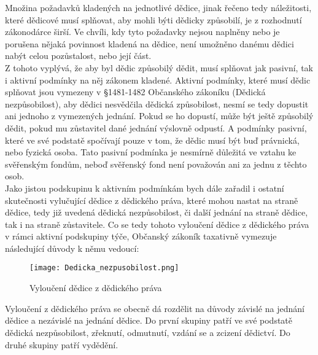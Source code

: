 \documentclass{article}
\begin{document}
Množina požadavků kladených na jednotlivé dědice, jinak řečeno tedy náležitosti, které dědicové musí splňovat, aby mohli býti dědicky způsobilí, je z rozhodnutí zákonodárce širší. Ve chvíli, kdy tyto požadavky nejsou naplněny nebo je porušena nějaká povinnost kladená na dědice, není umožněno danému dědici nabýt celou pozůstalost, nebo její část. \\

Z tohoto vyplývá, že aby byl dědic způsobilý dědit, musí splňovat jak pasivní, tak i aktivní podmínky na něj zákonem kladené. Aktivní podmínky, které musí dědic splňovat jsou vymezeny v §1481-1482 Občanského zákoníku (Dědická nezpůsobilost), aby dědici nesvědčila dědická způsobilost, nesmí se tedy dopustit ani jednoho z vymezených jednání. Pokud se ho dopustí, může být ještě způsobilý dědit, pokud mu zůstavitel dané jednání výslovně odpustí. A podmínky pasivní, které ve své podstatě spočívají pouze v tom, že dědic musí být buď právnická, nebo fyzická osoba. Tato pasivní podmínka je nesmírně důležitá ve vztahu ke svěřenským fondům, neboď svěřenský fond není považován ani za jednu z těchto osob.\\


Jako jistou podskupinu k aktivním podmínkám bych dále zařadil i ostatní skutečnosti vylučující dědice z dědického práva, které mohou nastat na straně dědice, tedy již uvedená dědická nezpůsobilost, či další jednání na straně dědice, tak i na straně zůstavitele. Co se tedy tohoto vyloučení dědice z dědického práva v rámci aktivní podskupiny týče, Občanský zákoník taxativně vymezuje následující důvody k němu vedoucí:

\begin{figure}[h]
\centering
\texttt{[image: Dedicka\_nezpusobilost.png]}
\caption[Vyloučení dědice z dědického práva]{Vyloučení dědice z dědického práva}
\label{fig:komparace}
\end{figure}

Vyloučení z dědického práva se obecně dá rozdělit na důvody závislé na jednání dědice a nezávislé na jednání dědice. Do první skupiny patří ve své podstatě dědická nezpůsobilost, zřeknutí, odmutnutí, vzdání se a zcizení dědictví. Do druhé skupiny patří vydědění. \\
\end{document}
